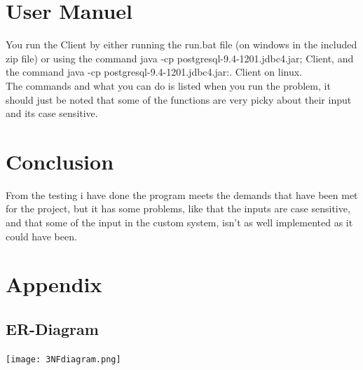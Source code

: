 \documentclass[a4paper,10pt,titlepage]{report}
\begin{document}
\section{User Manuel}
You run the Client by either running the run.bat file (on windows in the included zip file) or using the command java -cp postgresql-9.4-1201.jdbc4.jar; Client, and the command java -cp postgresql-9.4-1201.jdbc4.jar:. Client on linux. \\
The commands and what you can do is listed when you run the problem, it should just be noted that some of the functions are very picky about their input and its case sensitive.
\section{Conclusion}
From the testing i have done the program meets the demands that have been met for the project, but it has some problems, like that the inputs are case sensitive, and that some of the input in the custom system, isn't as well implemented as it could have been.
\section{Appendix}
\subsection{ER-Diagram}

\texttt{[image: 3NFdiagram.png]}
\end{document}
